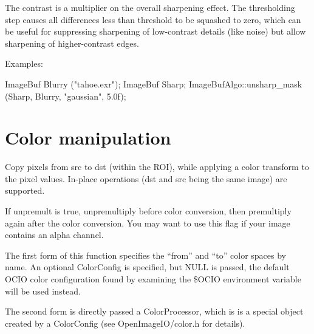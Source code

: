 The {\cf contrast} is a multiplier on the overall sharpening effect.  The
thresholding step causes all differences less than {\cf threshold} to be
squashed to zero, which can be useful for suppressing sharpening of
low-contrast details (like noise) but allow sharpening of
higher-contrast edges.

\smallskip
\noindent Examples:
\begin{code}
    ImageBuf Blurry ("tahoe.exr");
    ImageBuf Sharp;
    ImageBufAlgo::unsharp_mask (Sharp, Blurry, "gaussian", 5.0f);
\end{code}
\apiend


\section{Color manipulation}
\label{sec:iba:color}

 
Copy pixels from {\cf src} to {\cf dst} (within the ROI), while
applying a color transform to the pixel values.
In-place operations ({\cf dst} and {\cf src} being the same image)
are supported.

If {\cf unpremult} is {\cf true}, unpremultiply before color conversion,
then premultiply again after the color conversion.  You may want to use
this flag if your image contains an alpha channel.

The first form of this function specifies the ``from'' and ``to'' color
spaces by name. An optional {\cf ColorConfig} is specified, but {\cf NULL}
is passed, the default OCIO color configuration found by examining the {\cf
\$OCIO} environment variable will be used instead.

The second form is directly passed a {\cf ColorProcessor}, which is is a
special object created by a {\cf ColorConfig} (see {\cf OpenImageIO/color.h}
for details).

